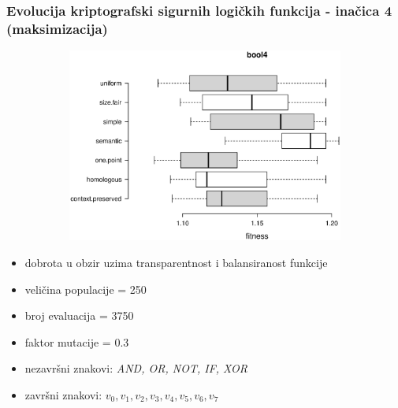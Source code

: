 \documentclass{beamer}
\begin{document}
\begin{frame}
\frametitle{Evolucija kriptografski sigurnih logičkih funkcija - inačica 4
 (maksimizacija)}


\begin{figure}[!htb]
\begin{figure}[H]
	\centering
	\includegraphics[trim=3cm 5.5cm 0cm 3.5cm, scale=0.3]{./boxPlots/bool4.eps}
\end{figure}

\endminipage
{}
\endminipage
\end{figure}

\begin{itemize}
\item{dobrota u obzir uzima transparentnost i balansiranost funkcije}
\item{veličina populacije = 250}
\item{broj evaluacija = 3750}
\item{faktor mutacije = 0.3}
\item{nezavršni znakovi: \textit{AND, OR, NOT, IF, XOR}}
\item{završni znakovi: \textit{$v_0, v_1, v_2, v_3, v_4, v_5, v_6, v_7$}}
\end{itemize}
\end{frame}
\end{document}
